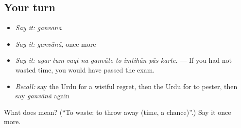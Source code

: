 \subsection*{Your turn}
\begin{itemize}
\raggedright
  \item \emph{Say it:} \emph{ganvānā}
  \item \emph{Say it:} \emph{ganvānā}, once more
  \item \emph{Say it:} \emph{agar tum vaqt na ganvāte to imtihān pās karte.} — If you had not wasted time, you would have passed the exam.
  \item \emph{Recall:} say the Urdu for a wistful regret, then the Urdu for to pester, then say \emph{ganvānā} again
\end{itemize}

\begin{tcolorbox}[breakable,colback=teal!4,colframe=teal!35!black,title={Before you move on}]
What does  mean? (\textquotedblleft{}To waste; to throw away (time, a chance)\textquotedblright{}.) Say it once more.
\end{tcolorbox}
